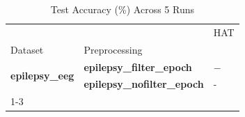 \begin{table}
\caption{Test Accuracy (\%) Across 5 Runs}
\label{tab:results_acc}
\begin{tabular}{lll}
\toprule
 &  & HAT \\
Dataset & Preprocessing &  \\
\midrule
\multirow[t]{2}{*}{\textbf{epilepsy_eeg}} & \textbf{epilepsy_filter_epoch} & $-$ \\
\textbf{} & \textbf{epilepsy_nofilter_epoch} & - \\
\cline{1-3}
\bottomrule
\end{tabular}
\end{table}
